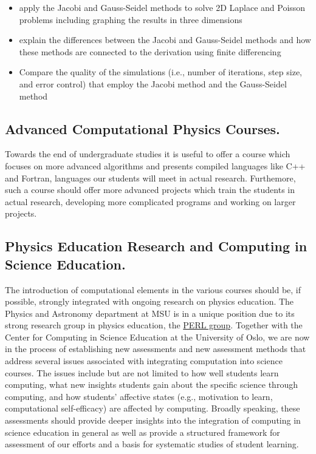 \documentclass[graybox,envcountchap,sectrefs]{svmult}
\begin{document}
\begin{itemize}
\item apply the Jacobi and Gauss-Seidel methods to solve 2D Laplace and Poisson problems including graphing the results in three dimensions

\item explain the differences between the Jacobi and Gauss-Seidel methods and how these methods are connected to the derivation using finite differencing

\item Compare the quality of the simulations (i.e., number of iterations, step size, and error control) that employ the Jacobi method and the Gauss-Seidel method
\end{itemize}


\subsection{Advanced Computational Physics Courses.}
Towards the end of undergraduate studies it is useful to offer a course which focuses on more advanced algorithms and presents compiled languages like C++ and Fortran, languages our students will meet in actual research.
Furthemore, such a course should offer more advanced projects which train the students in actual research, developing more complicated programs and working on larger projects.

\subsection{Physics Education Research and Computing in Science Education.}
The introduction of computational elements in the various courses should be, if possible,  strongly integrated with ongoing research on physics education.
The Physics and Astronomy department at MSU is in a unique position due to its strong research group in physics education, the \href{{http://www.pa.msu.edu/research/physics-education-lab}}{PERL group}. Together with the Center for Computing in Science Education at the University of Oslo, we are now in the process
of establishing new assessments
and new assessment methods that address several issues associated with
integrating computation into science courses. The issues include but
are not limited to how well students learn computing, what new
insights students gain about the specific science through computing,
and how students' affective states (e.g., motivation to learn,
computational self-efficacy) are affected by computing. Broadly
speaking, these assessments should provide deeper insights into the
integration of computing in science education in general as well as
provide a structured framework for assessment of our efforts and a
basis for systematic studies of student learning.  
\end{document}

